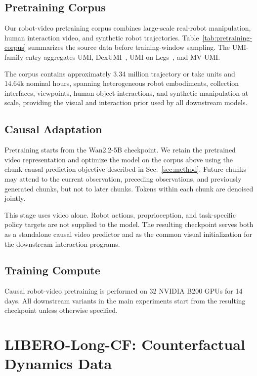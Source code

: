 \subsection{Pretraining Corpus}
\label{app:pretraining-data}

Our robot-video pretraining corpus combines large-scale real-robot manipulation,
human interaction video, and synthetic robot trajectories. Table~\ref{tab:pretraining-corpus}
summarizes the source data before training-window sampling. The UMI-family entry
aggregates UMI, DexUMI~\cite{xu2025dexumi}, UMI on Legs~\cite{ha2024umilegs}, and MV-UMI.

The corpus contains approximately 3.34 million trajectory or take units and
14.64k nominal hours, spanning heterogeneous robot embodiments, collection
interfaces, viewpoints, human-object interactions, and synthetic manipulation
at scale, providing the visual and interaction prior used by all downstream
\ours models.

\subsection{Causal Adaptation}
\label{app:pretraining-causal}

Pretraining starts from the Wan2.2-5B checkpoint. We retain the pretrained
video representation and optimize the model on the corpus above using the
chunk-causal prediction objective described in Sec.~\ref{sec:method}. Future
chunks may attend to the current observation, preceding observations, and
previously generated chunks, but not to later chunks. Tokens within each
chunk are denoised jointly.

This stage uses video alone. Robot actions, proprioception, and task-specific
policy targets are not supplied to the model. The resulting checkpoint serves
both as a standalone causal video predictor and as the common visual
initialization for the downstream \ours interaction programs.

\subsection{Training Compute}
\label{app:pretraining-compute}

Causal robot-video pretraining is performed on 32 NVIDIA B200 GPUs for
14 days. All downstream \ours variants in the main experiments start from
the resulting checkpoint unless otherwise specified.

\section{LIBERO-Long-CF: Counterfactual Dynamics Data}
\label{app:libero-cf}

